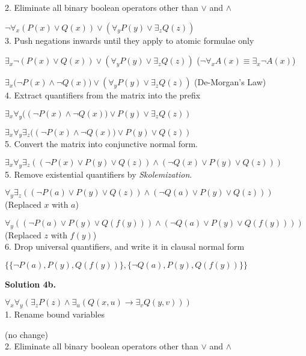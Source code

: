 \documentclass{article}
\newcommand{\tOne}{7.5cm}
\begin{document}
{2. Eliminate all binary boolean operators other than $\vee$ and $\wedge$

$\neg\forall_x(P(x) \vee Q(x)) \vee (\forall_yP(y) \vee \exists_zQ(z))$\\

3. Push negations inwards until they apply to atomic formulae only

$\exists_x\neg(P(x) \vee Q(x)) \vee (\forall_yP(y) \vee \exists_zQ(z))$ \tabto{\tOne}($\neg{\forall_{x}A(x)} \equiv \exists_{x} \neg{A(x)}$)

$\exists_x(\neg{P(x)} \wedge \neg{Q(x))} \vee (\forall_yP(y) \vee \exists_zQ(z))$ \tabto{\tOne}(De-Morgan's Law)\\

4. Extract quantifiers from the matrix into the prefix

$\exists_x\forall_y((\neg{P(x)} \wedge \neg{Q(x))} \vee P(y) \vee \exists_zQ(z))$

$\exists_x\forall_y\exists_z((\neg{P(x)} \wedge \neg{Q(x))} \vee P(y) \vee Q(z))$\\

5. Convert the matrix into conjunctive normal form.

$\exists_x\forall_y\exists_z((\neg{P(x)} \vee P(y) \vee Q(z)) \wedge (\neg{Q(x)} \vee P(y) \vee Q(z)))$\\

5. Remove existential quantifiers by \emph{Skolemization}.

$\forall_y\exists_z((\neg{P(a)} \vee P(y) \vee Q(z)) \wedge (\neg{Q(a)} \vee P(y) \vee Q(z)))$ \tabto{8.5cm}(Replaced $x$ with $a$)

$\forall_y((\neg{P(a)} \vee P(y) \vee Q(f(y))) \wedge (\neg{Q(a)} \vee P(y) \vee Q(f(y))))$ \tabto{8.5cm}(Replaced $z$ with $f(y)$)\\

6. Drop universal quantifiers, and write it in clausal normal form

$\{\{\neg{P(a)}, P(y), Q(f(y))\}, \{\neg{Q(a)}, P(y), Q(f(y))\}\}$

\pagebreak

\textbf{\large{Solution 4b.}}

$\forall_x\forall_y(\exists_zP(z) \wedge \exists_u(Q(x, u) \rightarrow \exists_vQ(y, v)))$\\

1. Rename bound variables

(no change)\\

2. Eliminate all binary boolean operators other than $\vee$ and $\wedge$

}
\end{document}
